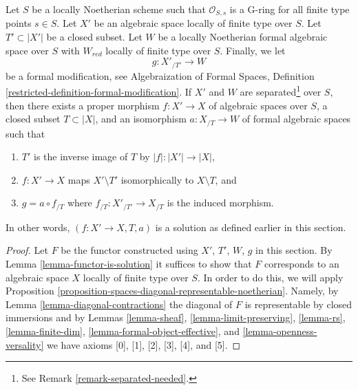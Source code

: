 \begin{theorem}
\label{theorem-contractions}
\begin{reference}
\cite[Theorem 3.1]{ArtinII}
\end{reference}
Let $S$ be a locally Noetherian scheme such that $\mathcal{O}_{S, s}$
is a G-ring for all finite type points $s \in S$. Let $X'$ be an algebraic
space locally of finite type over $S$. Let $T' \subset |X'|$ be a closed
subset. Let $W$ be a locally Noetherian formal algebraic space over $S$
with $W_{red}$ locally of finite type over $S$. Finally, we let
$$
g : X'_{/T'} \longrightarrow W
$$
be a formal modification, see Algebraization of Formal Spaces, Definition
\ref{restricted-definition-formal-modification}. If $X'$ and $W$ are
separated\footnote{See Remark \ref{remark-separated-needed}.} over $S$, then
there exists a proper morphism $f : X' \to X$ of algebraic spaces over $S$,
a closed subset $T \subset |X|$, and an isomorphism $a : X_{/T} \to W$
of formal algebraic spaces such that
\begin{enumerate}
\item $T'$ is the inverse image of $T$ by $|f| : |X'| \to |X|$,
\item $f : X' \to X$ maps $X' \setminus T'$ isomorphically to
$X \setminus T$, and
\item $g = a \circ f_{/T}$ where $f_{/T} : X'_{/T'} \to X_{/T}$
is the induced morphism.
\end{enumerate}
In other words, $(f : X' \to X, T, a)$ is a solution as defined earlier in
this section.
\end{theorem}

\begin{proof}
Let $F$ be the functor constructed using $X'$, $T'$, $W$, $g$ in this section.
By Lemma \ref{lemma-functor-is-solution} it suffices to show that
$F$ corresponds to an algebraic space $X$ locally of finite type over $S$.
In order to do this, we will apply
Proposition \ref{proposition-spaces-diagonal-representable-noetherian}.
Namely, by Lemma \ref{lemma-diagonal-contractions}
the diagonal of $F$ is representable by closed immersions
and by
Lemmas \ref{lemma-sheaf}, \ref{lemma-limit-preserving},
\ref{lemma-rs}, \ref{lemma-finite-dim},
\ref{lemma-formal-object-effective}, and \ref{lemma-openness-versality}
we have axioms [0], [1], [2], [3], [4], and [5].
\end{proof}


